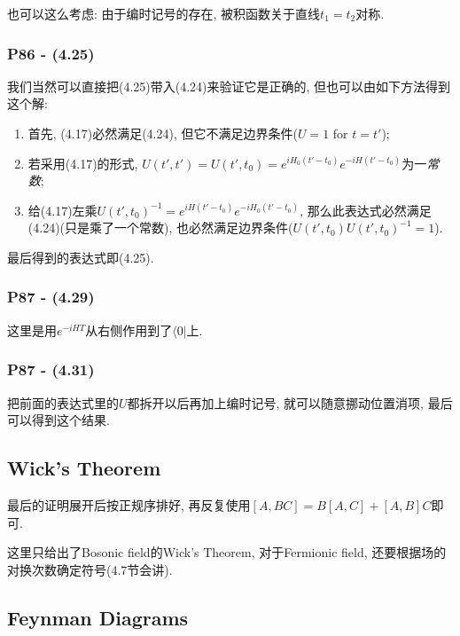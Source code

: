\documentclass[cn,hazy,green,11pt,device=normal,chinesefont=founder]{elegantnote}
\begin{document}
\begin{remark}
  也可以这么考虑: 由于编时记号的存在, 被积函数关于直线$t_1 = t_2$对称. 
\end{remark}

\subsubsection{P86 - (4.25)}

我们当然可以直接把(4.25)带入(4.24)来验证它是正确的, 但也可以由如下方法得到这个解: 
\begin{enumerate}
  \item 首先, (4.17)必然满足(4.24), 但它不满足边界条件($U = 1$ for $t = t'$); 
  \item 若采用(4.17)的形式, $U(t', t') = U(t', t_0) = e^{iH_0(t'-t_0)}e^{-iH(t'-t_0)}$为一\textit{常数}; 
  \item 给(4.17)左乘$U(t', t_0)^{-1} = e^{iH(t'-t_0)}e^{-iH_0(t'-t_0)}$, 那么此表达式必然满足(4.24)(只是乘了一个常数), 也必然满足边界条件($U(t', t_0)U(t', t_0)^{-1} = 1$). 
\end{enumerate}
最后得到的表达式即(4.25). 

\subsubsection{P87 - (4.29)}

这里是用$e^{-iHT}$从右侧作用到了$\langle 0|$上. 

\subsubsection{P87 - (4.31)}

把前面的表达式里的$U$都拆开以后再加上编时记号, 就可以随意挪动位置消项, 最后可以得到这个结果. 

\subsection{Wick's Theorem}

最后的证明展开后按正规序排好, 再反复使用$[A, BC] = B[A, C] + [A, B]C$即可. 

这里只给出了Bosonic field的Wick's Theorem, 对于Fermionic field, 还要根据场的对换次数确定符号(4.7节会讲). 

\subsection{Feynman Diagrams}
\end{document}
